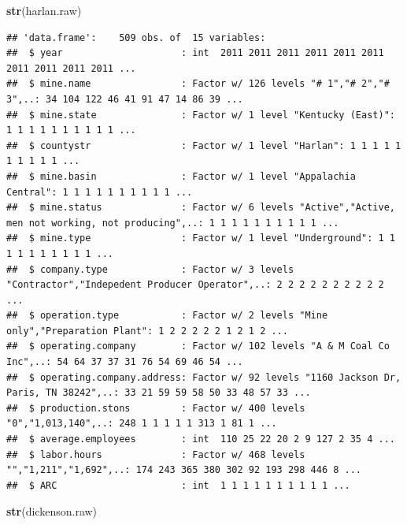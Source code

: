 \documentclass[12pt,]{article}
\newenvironment{Shaded}{\begin{snugshade}}{\end{snugshade}}
\newcommand{\KeywordTok}[1]{\textcolor[rgb]{0.13,0.29,0.53}{\textbf{#1}}}
\newcommand{\NormalTok}[1]{#1}
\begin{document}
\begin{Shaded}
\begin{Highlighting}[]
\KeywordTok{str}\NormalTok{(harlan.raw)}
\end{Highlighting}
\end{Shaded}

\begin{verbatim}
## 'data.frame':    509 obs. of  15 variables:
##  $ year                     : int  2011 2011 2011 2011 2011 2011 2011 2011 2011 2011 ...
##  $ mine.name                : Factor w/ 126 levels "# 1","# 2","# 3",..: 34 104 122 46 41 91 47 14 86 39 ...
##  $ mine.state               : Factor w/ 1 level "Kentucky (East)": 1 1 1 1 1 1 1 1 1 1 ...
##  $ countystr                : Factor w/ 1 level "Harlan": 1 1 1 1 1 1 1 1 1 1 ...
##  $ mine.basin               : Factor w/ 1 level "Appalachia Central": 1 1 1 1 1 1 1 1 1 1 ...
##  $ mine.status              : Factor w/ 6 levels "Active","Active, men not working, not producing",..: 1 1 1 1 1 1 1 1 1 1 ...
##  $ mine.type                : Factor w/ 1 level "Underground": 1 1 1 1 1 1 1 1 1 1 ...
##  $ company.type             : Factor w/ 3 levels "Contractor","Indepedent Producer Operator",..: 2 2 2 2 2 2 2 2 2 2 ...
##  $ operation.type           : Factor w/ 2 levels "Mine only","Preparation Plant": 1 2 2 2 2 2 1 2 1 2 ...
##  $ operating.company        : Factor w/ 102 levels "A & M Coal Co Inc",..: 54 64 37 37 31 76 54 69 46 54 ...
##  $ operating.company.address: Factor w/ 92 levels "1160 Jackson Dr, Paris, TN 38242",..: 33 21 59 59 58 50 33 48 57 33 ...
##  $ production.stons         : Factor w/ 400 levels "0","1,013,140",..: 248 1 1 1 1 1 313 1 81 1 ...
##  $ average.employees        : int  110 25 22 20 2 9 127 2 35 4 ...
##  $ labor.hours              : Factor w/ 468 levels "","1,211","1,692",..: 174 243 365 380 302 92 193 298 446 8 ...
##  $ ARC                      : int  1 1 1 1 1 1 1 1 1 1 ...
\end{verbatim}

\begin{Shaded}
\begin{Highlighting}[]
\KeywordTok{str}\NormalTok{(dickenson.raw)}
\end{Highlighting}
\end{Shaded}
\end{document}

